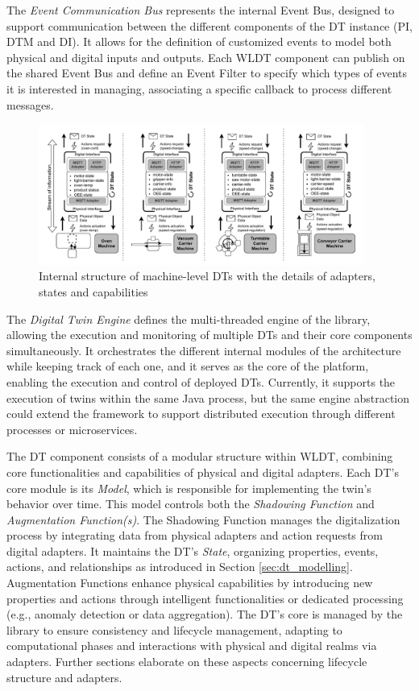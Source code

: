 The \textit{Event Communication Bus} represents the internal Event Bus, designed to support communication between the different components of the DT instance (PI, DTM and DI). It allows for the definition of customized events to model both physical and digital inputs and outputs. Each WLDT component can publish on the shared Event Bus and define an Event Filter to specify which types of events it is interested in managing, associating a specific callback to process different messages.

\begin{figure}[th!]
    \setlength{\belowcaptionskip}{-13pt}
    \centering
    \includegraphics[width=0.95\textwidth]{figures/engineering-wldt/DTs-zoom-in.pdf}
    \caption{Internal structure of machine-level DTs with the details of adapters, states and capabilities}
    \label{fig:dt-internal-structure-overview}
\end{figure}

The \textit{Digital Twin Engine} defines the multi-threaded engine of the library, allowing the execution and monitoring of multiple DTs and their core components simultaneously.
It orchestrates the different internal modules of the architecture while keeping track of each one, and it serves as the core of the platform, enabling the execution and control of deployed DTs.
Currently, it supports the execution of twins within the same Java process, but the same engine abstraction could extend the framework to support distributed execution through different processes or microservices.

The DT component consists of a modular structure within WLDT, combining core functionalities and capabilities of physical and digital adapters.
Each DT's core module is its \textit{Model}, which is responsible for implementing the twin's behavior over time. This model controls both the \textit{Shadowing Function} and \textit{Augmentation Function(s)}.
The Shadowing Function manages the digitalization process by integrating data from physical adapters and action requests from digital adapters.
It maintains the DT's \textit{State}, organizing properties, events, actions, and relationships as introduced in Section \ref{sec:dt_modelling}.
Augmentation Functions enhance physical capabilities by introducing new properties and actions through intelligent functionalities or dedicated processing (e.g., anomaly detection or data aggregation).
The DT's core is managed by the library to ensure consistency and lifecycle management, adapting to computational phases and interactions with physical and digital realms via adapters. 
Further sections elaborate on these aspects concerning lifecycle structure and adapters.

